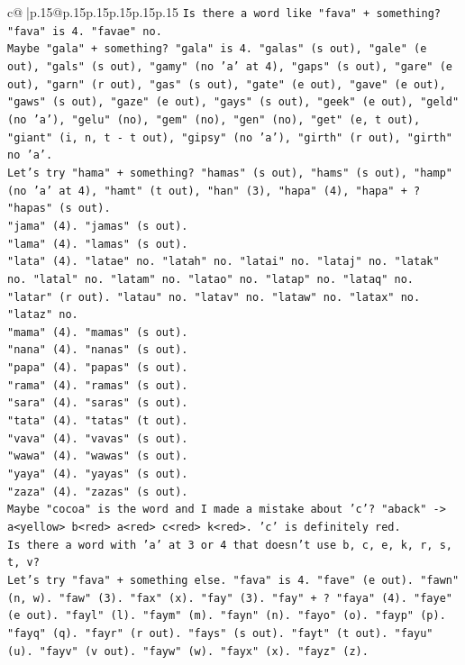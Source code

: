 \documentclass{article}
\begin{document}
{\begin{supertabular}{c@{$\;$}|p{.15\linewidth}@{}p{.15\linewidth}p{.15\linewidth}p{.15\linewidth}p{.15\linewidth}p{.15\linewidth}}
{{{\texttt{Is there a word like "fava" + something? "fava" is 4. "favae" no.} \\
\texttt{Maybe "gala" + something? "gala" is 4. "galas" (s out), "gale" (e out), "gals" (s out), "gamy" (no 'a' at 4), "gaps" (s out), "gare" (e out), "garn" (r out), "gas" (s out), "gate" (e out), "gave" (e out), "gaws" (s out), "gaze" (e out), "gays" (s out), "geek" (e out), "geld" (no 'a'), "gelu" (no), "gem" (no), "gen" (no), "get" (e, t out), "giant" (i, n, t {-} t out), "gipsy" (no 'a'), "girth" (r out), "girth" no 'a'.} \\
\texttt{Let's try "hama" + something? "hamas" (s out), "hams" (s out), "hamp" (no 'a' at 4), "hamt" (t out), "han" (3), "hapa" (4), "hapa" + ? "hapas" (s out).} \\
\texttt{"jama" (4). "jamas" (s out).} \\
\texttt{"lama" (4). "lamas" (s out).} \\
\texttt{"lata" (4). "latae" no. "latah" no. "latai" no. "lataj" no. "latak" no. "latal" no. "latam" no. "latao" no. "latap" no. "lataq" no. "latar" (r out). "latau" no. "latav" no. "lataw" no. "latax" no. "lataz" no.} \\
\texttt{"mama" (4). "mamas" (s out).} \\
\texttt{"nana" (4). "nanas" (s out).} \\
\texttt{"papa" (4). "papas" (s out).} \\
\texttt{"rama" (4). "ramas" (s out).} \\
\texttt{"sara" (4). "saras" (s out).} \\
\texttt{"tata" (4). "tatas" (t out).} \\
\texttt{"vava" (4). "vavas" (s out).} \\
\texttt{"wawa" (4). "wawas" (s out).} \\
\texttt{"yaya" (4). "yayas" (s out).} \\
\texttt{"zaza" (4). "zazas" (s out).} \\
\texttt{Maybe "cocoa" is the word and I made a mistake about 'c'? "aback" {-}> a<yellow> b<red> a<red> c<red> k<red>. 'c' is definitely red.} \\
\texttt{Is there a word with 'a' at 3 or 4 that doesn't use b, c, e, k, r, s, t, v?} \\
\texttt{Let's try "fava" + something else. "fava" is 4. "fave" (e out). "fawn" (n, w). "faw" (3). "fax" (x). "fay" (3). "fay" + ? "faya" (4). "faye" (e out). "fayl" (l). "faym" (m). "fayn" (n). "fayo" (o). "fayp" (p). "fayq" (q). "fayr" (r out). "fays" (s out). "fayt" (t out). "fayu" (u). "fayv" (v out). "fayw" (w). "fayx" (x). "fayz" (z).} \\
}}}
\end{supertabular}}
\end{document}
